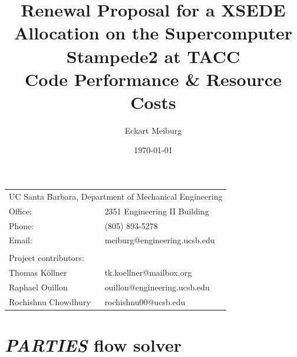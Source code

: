 \documentclass[10pt]{article}
\title{Renewal Proposal for a XSEDE Allocation on the Supercomputer Stampede2 at TACC\\
       {\textbf{Code Performance \& Resource Costs}}} %
\author{Eckart Meiburg} %
\date{\today} %
\begin{document}
\maketitle %

\begin{center}
\begin{tabular}{l l}
\multicolumn{2}{l}{UC Santa Barbara, Department of Mechanical Engineering} \\ %
Office:          & 2351 Engineering II Building \\
Phone:           & (805) 893-5278\\
Email:           & meiburg@engineering.ucsb.edu\\
\\
\multicolumn{2}{l}{Project contributors:} \\ %
Thomas K\"{o}llner    & tk.koellner@mailbox.org\\
Raphael Ouillon    & ouillon@engineering.ucsb.edu\\
Rochishnu Chowdhury & rochishnu00@ucsb.edu \\
\end{tabular}
\end{center}



\section{\textit{PARTIES} flow solver}
\end{document}
